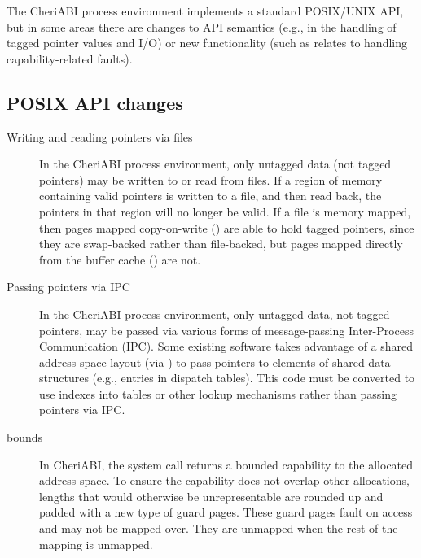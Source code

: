 \documentclass[12pt,twoside,openright,usletter]{article}
\newcommand{\ccode}[1]{{\small\ttfamily{#1}}}
\newcommand{\cconst}[1]{{\ccode{#1}}}
\newcommand{\cfunc}[1]{{\ccode{#1()}}}
\begin{document}
The CheriABI process environment implements a standard POSIX/UNIX API, but in
some areas there are changes to API semantics (e.g., in the handling of tagged
pointer values and I/O) or new functionality (such as relates to handling
capability-related faults).

\subsection{POSIX API changes}

\begin{description}
\item[Writing and reading pointers via files] In the CheriABI process
  environment, only untagged data (not tagged pointers) may be written to or
  read from files.
  If a region of memory containing valid pointers is written to a file, and
  then read back, the pointers in that region will no longer be valid.
  If a file is memory mapped, then pages mapped copy-on-write
  (\cconst{MAP\_PRIVATE}) are able to hold tagged pointers, since they are
  swap-backed rather than file-backed, but pages mapped directly from the
  buffer cache (\cconst{MAP\_SHARED}) are not.

\item[Passing pointers via IPC] In the CheriABI process environment, only
  untagged data, not tagged pointers, may be passed via various forms of
  message-passing Inter-Process Communication (IPC).
  Some existing software takes advantage of a shared address-space layout
  (via \cfunc{fork}) to pass pointers to elements of shared data structures
  (e.g., entries in dispatch tables).
  This code must be converted to use indexes into tables or other lookup
  mechanisms rather than passing pointers via IPC.

\item[\cfunc{mmap} bounds] In CheriABI, the \cfunc{mmap} system
   call returns a bounded capability to the allocated address space.
   To ensure the capability does not overlap other allocations,
   lengths that would otherwise be unrepresentable are rounded up
   and padded with a new type of guard pages.
   These guard pages fault on access and may not be mapped over.
   They are unmapped when the rest of the mapping is unmapped.


\end{description}
\end{document}
